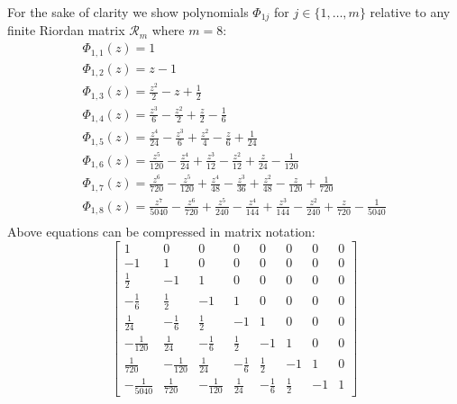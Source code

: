 For the sake of clarity we show polynomials $\Phi_{1j}$ for $j\in \lbrace 1,\ldots,m \rbrace$ relative to any finite Riordan
matrix $\mathcal{R}_{m}$ where $m=8$:
\begin{displaymath}
\begin{array}{c}
 \Phi_{ 1, 1 }{\left (z \right )} = 1\\
 \Phi_{ 1, 2 }{\left (z \right )} = z - 1\\
 \Phi_{ 1, 3 }{\left (z \right )} = \frac{z^{2}}{2} - z + \frac{1}{2}\\
 \Phi_{ 1, 4 }{\left (z \right )} = \frac{z^{3}}{6} - \frac{z^{2}}{2} + \frac{z}{2} - \frac{1}{6}\\
 \Phi_{ 1, 5 }{\left (z \right )} = \frac{z^{4}}{24} - \frac{z^{3}}{6} + \frac{z^{2}}{4} - \frac{z}{6} + \frac{1}{24}\\
 \Phi_{ 1, 6 }{\left (z \right )} = \frac{z^{5}}{120} - \frac{z^{4}}{24} + \frac{z^{3}}{12} - \frac{z^{2}}{12} + \frac{z}{24} - \frac{1}{120}\\
 \Phi_{ 1, 7 }{\left (z \right )} = \frac{z^{6}}{720} - \frac{z^{5}}{120} + \frac{z^{4}}{48} - \frac{z^{3}}{36} + \frac{z^{2}}{48} - \frac{z}{120} + \frac{1}{720}\\
 \Phi_{ 1, 8 }{\left (z \right )} = \frac{z^{7}}{5040} - \frac{z^{6}}{720} + \frac{z^{5}}{240} - \frac{z^{4}}{144} + \frac{z^{3}}{144} - \frac{z^{2}}{240} + \frac{z}{720} - \frac{1}{5040}\\
\end{array}
\end{displaymath}
Above equations can be compressed in matrix notation:
\begin{displaymath}
\left[\begin{matrix}1 & 0 & 0 & 0 & 0 & 0 & 0 & 0\\-1 & 1 & 0 & 0 & 0 & 0 & 0 & 0\\\frac{1}{2} & -1 & 1 & 0 & 0 & 0 & 0 & 0\\- \frac{1}{6} & \frac{1}{2} & -1 & 1 & 0 & 0 & 0 & 0\\\frac{1}{24} & - \frac{1}{6} & \frac{1}{2} & -1 & 1 & 0 & 0 & 0\\- \frac{1}{120} & \frac{1}{24} & - \frac{1}{6} & \frac{1}{2} & -1 & 1 & 0 & 0\\\frac{1}{720} & - \frac{1}{120} & \frac{1}{24} & - \frac{1}{6} & \frac{1}{2} & -1 & 1 & 0\\- \frac{1}{5040} & \frac{1}{720} & - \frac{1}{120} & \frac{1}{24} & - \frac{1}{6} & \frac{1}{2} & -1 & 1\end{matrix}\right] 
\end{displaymath}
